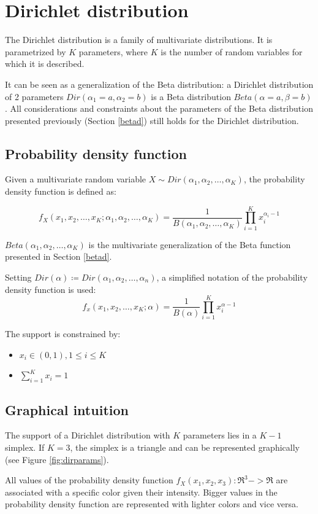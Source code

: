\section{Dirichlet distribution}
The Dirichlet distribution is a family of multivariate distributions.
It is parametrized by $K$ parameters, where $K$ is the number of random variables for which it is described.

It can be seen as a generalization of the Beta distribution: a Dirichlet distribution of 2 parameters $Dir(\alpha_1=a, \alpha_2=b)$ is a Beta distribution $Beta(\alpha=a, \beta=b)$.
All considerations and constraints about the parameters of the Beta distribution presented previously (Section \ref{betad}) still holds for the Dirichlet distribution.

\subsection{Probability density function}
Given a multivariate random variable $X \sim Dir(\alpha_1, \alpha_2, \dots, \alpha_K)$, the probability density function is defined as:

$$f_{X}(x_1, x_2, \dots, x_K; \alpha_1, \alpha_2, \dots, \alpha_K) = \frac{1}{B(\alpha_1, \alpha_2, \dots, \alpha_K)} \prod_{i=1}^{K} x_i^{\alpha_i - 1}$$

$Beta(\alpha_1, \alpha_2, \dots, \alpha_K)$ is the multivariate generalization of the Beta function presented in Section \ref{betad}.

Setting $Dir(\alpha) \coloneqq Dir(\alpha_1, \alpha_2, \dots, \alpha_n)$, a simplified notation of the probability density function is used:
$$f_{x}(x_1, x_2, \dots, x_K; \alpha) = \frac{1}{B(\alpha)} \prod_{i=1}^{K} x_i^{\alpha - 1}$$

The support is constrained by:
\begin{itemize}
    \item $x_i \in (0, 1), 1 \leq i \leq K $
    \item $\sum_{i=1}^K x_i = 1$
\end{itemize}

\subsection{Graphical intuition}
The support of a Dirichlet distribution with $K$ parameters lies in a $K-1$ simplex.
If $K=3$, the simplex is a triangle and can be represented graphically (see Figure \ref{fig:dirparams}).

All values of the probability density function $f_X(x_1, x_2, x_3): \Re^3 -> \Re$ are associated with a specific color given their intensity.
Bigger values in the probability density function are represented with lighter colors and vice versa.

